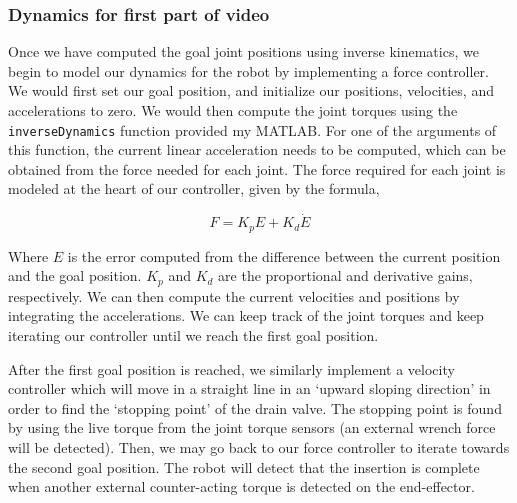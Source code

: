 \documentclass[conference]{IEEEtran}
\begin{document}
\subsubsection{Dynamics for first part of video}

Once we have computed the goal joint positions using inverse kinematics, we begin 
to model our dynamics for the robot by implementing a force controller. We would
first set our goal position, and initialize our positions, velocities, and accelerations
to zero. We would then compute the joint torques using the \texttt{inverseDynamics}
function provided my MATLAB. For one of the arguments of this function, the current linear acceleration needs to be
computed, which can be obtained from the force needed for each joint. The force required
for each joint is modeled at the heart of our controller, given by the formula,

\[
    F = K_p E + K_d \dot{E}
\]

Where $E$ is the error computed from the difference between the current position and
the goal position. $K_p$ and $K_d$ are the proportional and derivative gains, respectively.
We can then compute the current velocities and positions by integrating the accelerations.
We can keep track of the joint torques and keep iterating our controller until we reach the first goal
position.

After the first goal position is reached, we similarly implement a velocity controller
which will move in a straight line in an `upward sloping direction' in order to find the
`stopping point' of the drain valve. The stopping point is found by using the live torque from
the joint torque sensors (an external wrench force will be detected). Then, we may go back to
our force controller to iterate towards the second goal position. The robot will detect that
the insertion is complete when another external counter-acting torque is detected on the end-effector.



\end{document}
